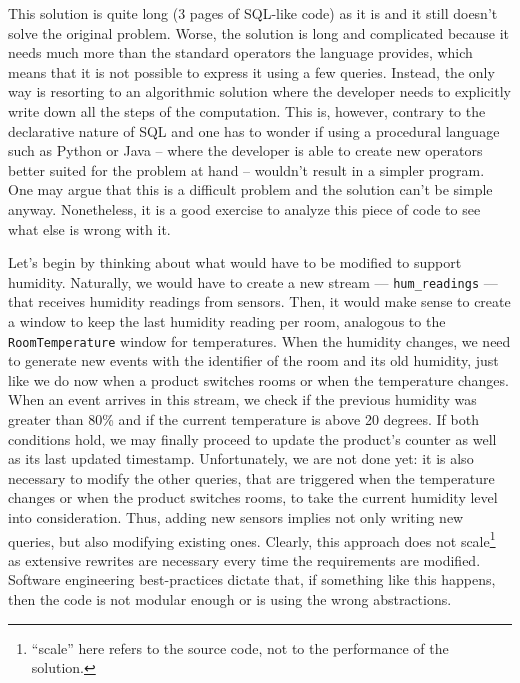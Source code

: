 This solution is quite long (3 pages of SQL-like code) as it is and it
still doesn't solve the original problem. Worse, the solution is long
and complicated because it needs much more than the standard operators
the language provides, which means that it is not possible to express
it using a few queries. Instead, the only way is resorting to an
algorithmic solution where the developer needs to explicitly write
down all the steps of the computation. This is, however, contrary to
the declarative nature of SQL and one has to wonder if using a
procedural language such as Python or Java -- where the developer is
able to create new operators better suited for the problem at hand --
wouldn't result in a simpler program. One may argue that this is a
difficult problem and the solution can't be simple
anyway. Nonetheless, it is a good exercise to analyze this piece of
code to see what else is wrong with it.

Let's begin by thinking about what would have to be modified to
support humidity. Naturally, we would have to create a new stream ---
\verb=hum_readings= --- that receives humidity readings from
sensors. Then, it would make sense to create a window to keep the last
humidity reading per room, analogous to the \verb=RoomTemperature=
window for temperatures. When the humidity changes, we need to
generate new events with the identifier of the room and its old
humidity, just like we do now when a product switches rooms or when
the temperature changes. When an event arrives in this stream, we
check if the previous humidity was greater than 80\% and if the
current temperature is above 20 degrees. If both conditions hold, we
may finally proceed to update the product's counter as well as its
last updated timestamp. Unfortunately, we are not done yet: it is also
necessary to modify the other queries, that are triggered when the
temperature changes or when the product switches rooms, to take the
current humidity level into consideration. Thus, adding new sensors
implies not only writing new queries, but also modifying existing
ones. Clearly, this approach does not scale\footnote{``scale'' here
  refers to the source code, not to the performance of the solution.}
as extensive rewrites are necessary every time the requirements are
modified. Software engineering best-practices dictate that, if
something like this happens, then the code is not modular enough or is
using the wrong abstractions.

